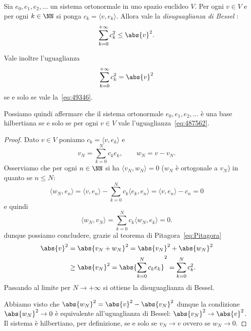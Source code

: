 \begin{theorem}
\label{th:bessel}%
Sia $e_0, e_1, e_2, \dots$ un sistema ortonormale in uno spazio euclideo $V$.
Per ogni $v\in V$ e per ogni $k\in \NN$ si ponga $c_k = \langle v,e_k\rangle$.
Allora vale la
\emph{disuguaglianza di Bessel}%
:
\begin{equation}\label{eq:disuguaglianza_Bessel}
\sum_{k=0}^{+\infty} c_k^2 \le \abs{v}^2.
\end{equation}

Vale inoltre l'uguaglianza
\begin{equation}\label{eq:487562}
\sum_{k=0}^{+\infty} c_k^2 = \abs{v}^2
\end{equation}
se e solo se vale la~\eqref{eq:49346}.

Possiamo quindi affermare che il sistema ortonormale $e_0, e_1, e_2, \dots$
è una base hilbertiana se e solo se per ogni $v\in V$ vale l'uguaglianza~\eqref{eq:487562}.
\end{theorem}
%
\begin{proof}
Dato $v\in V$ poniamo $c_k = \langle v,e_k\rangle$ e
\[
   v_N = \sum_{k=0}^N c_k e_k, \qquad w_N = v - v_N.
\]
Osserviamo che per ogni $n\in \NN$ si ha $\langle v_N,w_N\rangle=0$
($w_N$ è ortogonale a $v_N$)
in quanto se $n\le N$:
\[
  \langle w_N , e_n \rangle
  = \langle v, e_n\rangle - \sum_{k=0}^N c_k \langle e_k, e_n\rangle
  = \langle v,e_n\rangle - c_n = 0
\]
e quindi
\[
 \langle w_N, v_N \rangle = \sum_{k=0}^N c_k \langle w_N, e_k\rangle = 0.
\]
dunque possiamo concludere, grazie al teorema di Pitagora~\eqref{eq:Pitagora}
\begin{align*}
  \abs{v}^2
  &= \abs{v_N + w_N}^2
  = \abs{v_N}^2 + \abs{w_N}^2 \\
  &\ge \abs{v_N}^2 = \abs{\sum_{k=0}^N c_k e_k}^2
  = \sum_{k=0}^N c_k^2.
\end{align*}
Passando al limite per $N\to +\infty$ si ottiene la disuguaglianza
di Bessel.

Abbiamo visto che $\abs{w_N}^2 = \abs{v}^2 - \abs{v_N}^2$
dunque la condizione $\abs{w_N}^2\to 0$ è equivalente
all'uguaglianza di Bessel: $\abs{v_N}^2 \to \abs{v}^2$.
Il sistema è hilbertiano, per definizione, se e solo se $v_N \to v$
ovvero se $w_N\to 0$.
\end{proof}

